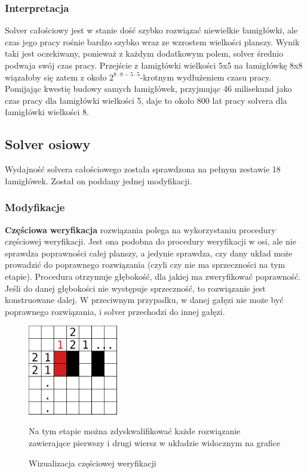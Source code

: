 \subsubsection{Interpretacja}
    Solver całościowy jest w stanie dość szybko rozwiązać niewielkie łamigłówki,
ale czas jego pracy rośnie bardzo szybko wraz ze wzrostem wielkości planszy. Wynik taki jest oczekiwany,
ponieważ z każdym dodatkowym polem, solver średnio podwaja swój czas pracy. Przejście z łamigłówki
wielkości 5x5 na łamigłówkę 8x8 wiązałoby się zatem z około $2^{8 \cdot 8 - 5 \cdot 5}$-krotnym wydłużeniem
czasu pracy. Pomijając kwestię budowy samych łamigłówek, przyjmując 46 milisekund jako czas pracy 
dla łamigłówki wielkości 5, daje to około 800 lat pracy solvera dla łamigłówki wielkości 8.


\subsection{Solver osiowy}
    Wydajność solvera całościowego została sprawdzona na pełnym zestawie 18 łamigłówek. Został
on poddany jednej modyfikacji.

\subsubsection{Modyfikacje}
    \textbf{Częściowa weryfikacja} rozwiązania polega na wykorzystaniu procedury częściowej weryfikacji.
Jest ona podobna do procedury weryfikacji w osi, ale nie sprawdza poprawności całej planszy,
a jedynie sprawdza, czy dany układ może prowadzić do poprawnego rozwiązania (czyli czy nie ma sprzeczności na tym etapie).
Procedura otrzymuje głębokość, dla jakiej ma zweryfikować poprawność. Jeśli do danej głębokości nie
występuje sprzeczność, to rozwiązanie jest konstruowane dalej. W przeciwnym przypadku, w danej gałęzi
nie może być poprawnego rozwiązania, i solver przechodzi do innej gałęzi.

\begin{figure}[h]
    \centering
    \includegraphics[width=0.35\textwidth]{images/partial_check_example.png}
    \caption{Wizualizacja częściowej weryfikacji}
    Na tym etapie można zdyskwalifikować każde rozwiązanie zawierające pierwszy i drugi wiersz
w układzie widocznym na grafice
\end{figure}

